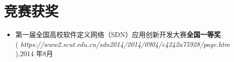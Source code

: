 \documentclass{resume}
\begin{document}
\section{竞赛获奖}
\begin{itemize}[parsep=0.2ex]
  \item 第一届全国高校软件定义网络（SDN）应用创新开发大赛\textbf{全国一等奖}\\( \textit{https://www2.scut.edu.cn/sdn2014/2014/0904/c4242a75928/page.htm} ),2014 年8月
\end{itemize}

\end{document}
